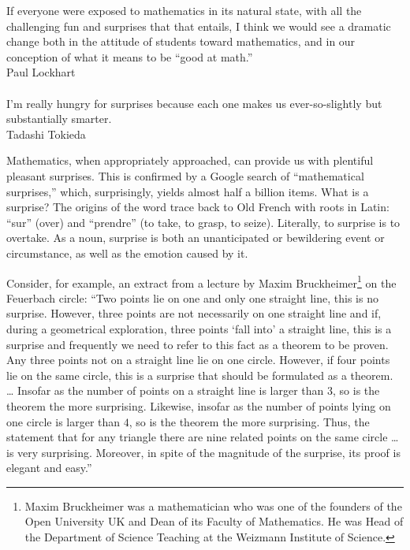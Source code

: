 
\maketitle

\foreword

\begin{flushright}
\parbox{7cm}{
\begin{footnotesize}
\begin{flushright}
If everyone were exposed to mathematics in its natural state, with all the challenging fun and surprises that that entails, I think we would see a dramatic change both in the attitude of students toward mathematics, and in our conception of what it means to be ``good at math.''\\
Paul Lockhart\mbox{}\\\mbox{}\\
I'm really hungry for surprises because each one makes us ever-so-slightly but substantially smarter.\\
Tadashi Tokieda
\end{flushright}
\end{footnotesize}
}
\end{flushright}

\medskip

Mathematics, when appropriately approached, can provide us with plentiful pleasant surprises. This is confirmed by a Google search of ``mathematical surprises,'' which, surprisingly, yields almost half a billion items. What is a surprise? The origins of the word trace back to Old French with roots in Latin: ``sur'' (over) and ``prendre'' (to take, to grasp, to seize). Literally, to surprise is to overtake. As a noun, surprise is both an unanticipated or bewildering event or circumstance, as well as the emotion caused by it.

Consider, for example, an extract from a lecture by Maxim Bruckheimer\footnote{Maxim Bruckheimer was a mathematician who was one of the founders of the Open University UK and Dean of its Faculty of Mathematics. He was Head of the Department of Science Teaching at the Weizmann Institute of Science.} on the Feuerbach circle: ``Two points lie on one and only one straight line, this is no surprise. However, three points are not necessarily on one straight line and if, during a geometrical exploration, three points `fall into' a straight line, this is a surprise and frequently we need to refer to this fact as a theorem to be proven. Any three points not on a straight line lie on one circle. However, if four points lie on the same circle, this is a surprise that should be formulated as a theorem. \ldots{} Insofar as the number of points on a straight line is larger than $3$, so is the theorem the more surprising. Likewise, insofar as the number of points lying on one circle is larger than $4$, so is the theorem the more surprising. Thus, the statement that for any triangle there are nine related points on the same circle … is very surprising. Moreover, in spite of the magnitude of the surprise, its proof is elegant and easy.''

